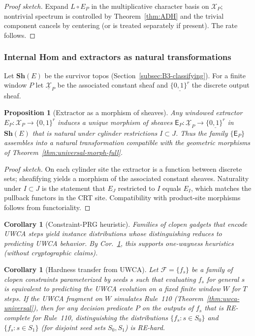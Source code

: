 \documentclass[12pt]{article}
\newtheorem{corollary}[theorem]{Corollary}
\newtheorem{proposition}[theorem]{Proposition}
\numberwithin{equation}{section}
\begin{document}
\begin{proof}[Proof sketch]
Expand $L\circ E_P$ in the multiplicative character basis on $\mathscr{X}_P$; nontrivial spectrum is controlled by Theorem~\ref{thm:ADH} and the trivial component cancels by centering (or is treated separately if present). The rate follows.
\end{proof}

\subsubsection{Internal Hom and extractors as natural transformations}\label{subsec:C3-internal}
Let $\mathbf{Sh}(E)$ be the survivor topos (Section~\ref{subsec:B3-classifying}). For a finite window $P$ let $\underline{\mathscr{X}}_P$ be the associated constant sheaf and $\underline{\{0,1\}^r}$ the discrete output sheaf.

\begin{proposition}[Extractor as a morphism of sheaves]\label{prop:extractor-morphism}
Any windowed extractor $E_P: \mathscr{X}_P\to \{0,1\}^r$ induces a unique morphism of sheaves $\mathsf{E}_P: \underline{\mathscr{X}}_P\to \underline{\{0,1\}^r}$ in $\mathbf{Sh}(E)$ that is natural under cylinder restrictions $I\subset J$. Thus the family $\{\mathsf{E}_P\}$ assembles into a natural transformation compatible with the geometric morphisms of Theorem~\ref{thm:universal-morph-full}.
\end{proposition}

\begin{proof}[Proof sketch]
On each cylinder site the extractor is a function between discrete sets; sheafifying yields a morphism of the associated constant sheaves. Naturality under $I\subset J$ is the statement that $E_J$ restricted to $I$ equals $E_I$, which matches the pullback functors in the CRT site. Compatibility with product-site morphisms follows from functoriality.
\end{proof}

\begin{corollary}[Constraint-PRG heuristic]\label{cor:prg-heur}
Families of clopen gadgets that encode UWCA steps yield instance distributions whose distinguishing reduces to predicting UWCA behavior. By Cor.~\ref{cor:hardness-transfer}, this supports one-wayness heuristics (without cryptographic claims).
\end{corollary}

\begin{corollary}[Hardness transfer from UWCA]\label{cor:hardness-transfer}
Let $\mathcal{F}=\{f_s\}$ be a family of clopen constraints parameterized by seeds $s$ such that evaluating $f_s$ for general $s$ is equivalent to predicting the UWCA evolution on a fixed finite window $W$ for $T$ steps. If the UWCA fragment on $W$ simulates Rule~110 (Theorem~\ref{thm:uwca-universal}), then for any decision predicate $P$ on the outputs of $f_s$ that is RE-complete for Rule~110, distinguishing the distributions $\{f_s: s\in S_0\}$ and $\{f_s: s\in S_1\}$ (for disjoint seed sets $S_0,S_1$) is RE-hard.

\end{corollary}
\end{document}
